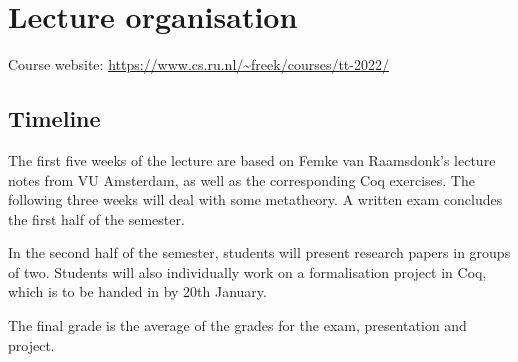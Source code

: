 \section{Lecture organisation}

Course website: \url{https://www.cs.ru.nl/~freek/courses/tt-2022/}

\subsection{Timeline}
The first five weeks of the lecture are based on Femke van Raamsdonk's
lecture notes from VU Amsterdam, as well as the corresponding Coq exercises.
The following three weeks will deal with some metatheory.
A written exam concludes the first half of the semester.

In the second half of the semester, students will present research papers
in groups of two.
Students will also individually work on a formalisation project in Coq,
which is to be handed in by 20th January.

The final grade is the average of the grades for the exam, presentation and
project.
